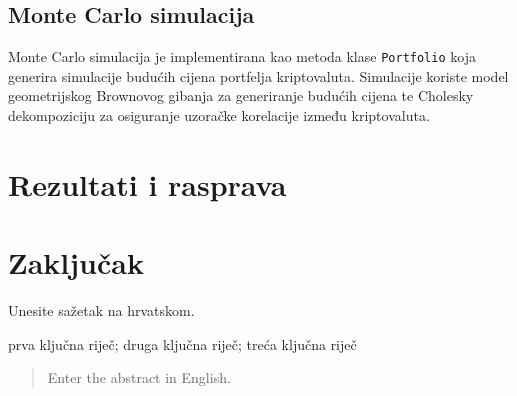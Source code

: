 \documentclass[zavrsnirad]{fer}
\begin{document}
\section{Monte Carlo simulacija}
\label{sek:monte_carlo_simulacija}
Monte Carlo simulacija je implementirana kao metoda klase
\texttt{Portfolio} koja generira simulacije budućih cijena portfelja
kriptovaluta. Simulacije koriste model geometrijskog Brownovog gibanja
za generiranje budućih cijena te Cholesky dekompoziciju za
osiguranje uzoračke korelacije između kriptovaluta.












\chapter{Rezultati i rasprava}
\label{pog:rezultati_i_rasprava}

\Blindtext

\chapter{Zaključak}
\label{pog:zakljucak}

\blindtext





\begin{sazetak}
	Unesite sažetak na hrvatskom.

	\blindtext
\end{sazetak}

\begin{kljucnerijeci}
	prva ključna riječ; druga ključna riječ; treća ključna riječ
\end{kljucnerijeci}

\begin{abstract}
	Enter the abstract in English.

	\blindtext
\end{abstract}
\end{document}
